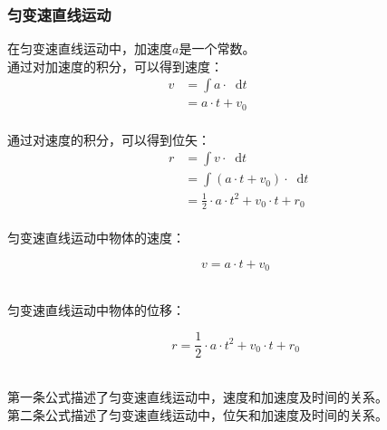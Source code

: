 \documentclass[UTF8]{ctexart}
\newcommand*{\dif}{\mathop{}\!\mathrm{d}}
\begin{document}
\subsubsection{匀变速直线运动}
    \setcounter{equation}{0}
    在匀变速直线运动中，加速度$a$是一个常数。\\[3mm]
    通过对加速度的积分，可以得到速度：
    \begin{align}
        v
        &=\int a\cdot\dif t~~~~~~~~~~~~~~~~~~~~\\[3mm]
        &=a\cdot t+v_0
    \end{align}\\
    通过对速度的积分，可以得到位矢：
    \begin{align}
        ~~r
        &=\int v\cdot\dif t\\[3mm]
        &=\int (a\cdot t+v_0)\cdot\dif t\\[3mm]
        &=\frac{1}{2}\cdot a\cdot t^2+v_0\cdot t+r_0
    \end{align}\\
    匀变速直线运动中物体的速度：
    \begin{large}
        \begin{equation*}
            v=a\cdot t+v_0            
        \end{equation*}
    \end{large}\\
    匀变速直线运动中物体的位移：
    \begin{large}
        \begin{equation*}
            r=\frac{1}{2}\cdot a\cdot t^2+v_0\cdot t+r_0
        \end{equation*}
    \end{large}\\
    第一条公式描述了匀变速直线运动中，速度和加速度及时间的关系。\\[3mm]
    第二条公式描述了匀变速直线运动中，位矢和加速度及时间的关系。

\newpage
\end{document}
